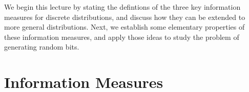 \documentclass[12pt]{article}
\begin{document}
	\MakeScribeTop

We begin this lecture by stating the defintions of the three key information measures for discrete distributions, and discuss how they can be extended to more general distributions. Next, we establish some elementary properties of these information measures, and apply those ideas to study the problem of generating random bits. 


\section{Information Measures} 
\end{document}
